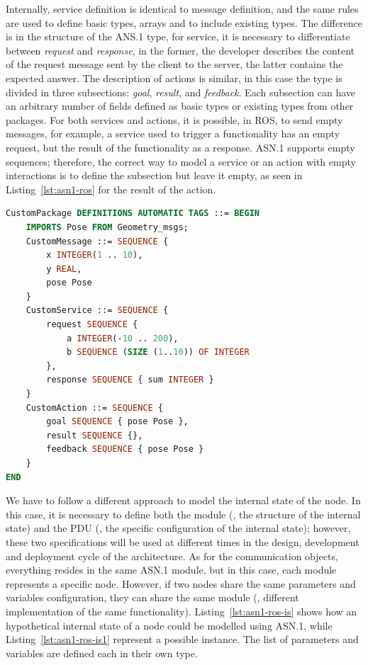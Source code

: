 Internally, service definition is identical to message definition, and the same rules are used to define basic types, arrays and to include existing types. The difference is in the structure of the ANS.1 type, for service, it is necessary to differentiate between \textit{request} and \textit{response}, in the former, the developer describes the content of the request message sent by the client to the server, the latter contains the expected answer. The description of actions is similar, in this case the type is divided in three subsections: \textit{goal}, \textit{result}, and \textit{feedback}. Each subsection can have an arbitrary number of fields defined as basic types or existing types from other packages. For both services and actions, it is possible, in ROS, to send empty messages, for example, a service used to trigger a functionality has an empty request, but the result of the functionality as a response. ASN.1 supports empty sequences; therefore, the correct way to model a service or an action with empty interactions is to define the subsection but leave it empty, as seen in Listing~\ref{lst:asn1-ros} for the result of the action.

\begin{lstlisting}[language=ASN1,caption={ROS message, service and action definition using ASN.1.},label=lst:asn1-ros]
CustomPackage DEFINITIONS AUTOMATIC TAGS ::= BEGIN
	IMPORTS Pose FROM Geometry_msgs;
	CustomMessage ::= SEQUENCE {
		x INTEGER(1 .. 10),
		y REAL,
		pose Pose
	}
	CustomService ::= SEQUENCE {
		request SEQUENCE {
			a INTEGER(-10 .. 200),
			b SEQUENCE (SIZE (1..10)) OF INTEGER
		},
		response SEQUENCE { sum INTEGER }
	}
	CustomAction ::= SEQUENCE {
		goal SEQUENCE { pose Pose },
		result SEQUENCE {},
		feedback SEQUENCE { pose Pose }
	}
END
\end{lstlisting}

We have to follow a different approach to model the internal state of the node. In this case, it is necessary to define both the module (\ie, the structure of the internal state) and the PDU (\ie, the specific configuration of the internal state); however, these two specifications will be used at different times in the design, development and deployment cycle of the architecture. As for the communication objects, everything resides in the same ASN.1 module, but in this case, each module represents a specific node. However, if two nodes share the same parameters and variables configuration, they can share the same module (\eg, different implementation of the same functionality). Listing~\ref{lst:asn1-ros-is} shows how an hypothetical internal state of a node could be modelled using ASN.1, while Listing~\ref{lst:asn1-ros-is1} represent a possible instance. The list of parameters and variables are defined each in their own type.

